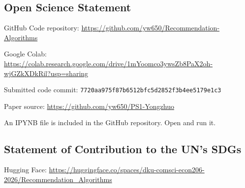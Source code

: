 \subsection*{Open Science Statement}
GitHub Code repository: {\def\UrlBreaks{\do a\do b\do c\do d\do e\do f\do g\do h\do i\do j\do k\do l\do m\do n\do o\do p\do q\do r\do s\do t\do u\do v\do w\do x\do y\do z\do A\do B\do C\do D\do E\do F\do G\do H\do I\do J\do K\do L\do M\do N\do O\do P\do Q\do R\do S\do T\do U\do V\do W\do X\do Y\do Z\do 0\do 1\do 2\do 3\do 4\do 5\do 6\do 7\do 8\do 9\do /\do -\do _\do .\do ?\do =\do &}\url{https://github.com/yw650/Recommendation-Algorithms}}

Google Colab: {\def\UrlBreaks{\do a\do b\do c\do d\do e\do f\do g\do h\do i\do j\do k\do l\do m\do n\do o\do p\do q\do r\do s\do t\do u\do v\do w\do x\do y\do z\do A\do B\do C\do D\do E\do F\do G\do H\do I\do J\do K\do L\do M\do N\do O\do P\do Q\do R\do S\do T\do U\do V\do W\do X\do Y\do Z\do 0\do 1\do 2\do 3\do 4\do 5\do 6\do 7\do 8\do 9\do /\do -\do _\do .\do ?\do =\do &}\url{https://colab.research.google.com/drive/1mYoomco3ywsZb8PaX2oh-wjGZkXDkRil?usp=sharing}}

Submitted code commit: {\def\UrlBreaks{\do a\do b\do c\do d\do e\do f\do g\do h\do i\do j\do k\do l\do m\do n\do o\do p\do q\do r\do s\do t\do u\do v\do w\do x\do y\do z\do A\do B\do C\do D\do E\do F\do G\do H\do I\do J\do K\do L\do M\do N\do O\do P\do Q\do R\do S\do T\do U\do V\do W\do X\do Y\do Z\do 0\do 1\do 2\do 3\do 4\do 5\do 6\do 7\do 8\do 9\do /\do -\do _\do .\do ?\do =\do &}\nolinkurl{7720aa975f87b6512bfc5d2852f3b4ee5179e1c3}}

Paper source: {\def\UrlBreaks{\do a\do b\do c\do d\do e\do f\do g\do h\do i\do j\do k\do l\do m\do n\do o\do p\do q\do r\do s\do t\do u\do v\do w\do x\do y\do z\do A\do B\do C\do D\do E\do F\do G\do H\do I\do J\do K\do L\do M\do N\do O\do P\do Q\do R\do S\do T\do U\do V\do W\do X\do Y\do Z\do 0\do 1\do 2\do 3\do 4\do 5\do 6\do 7\do 8\do 9\do /\do -\do _\do .\do ?\do =\do &}\url{https://github.com/yw650/PS1-Yongzhuo}}

An IPYNB file is included in the GitHub repository. Open and run it.

\subsection*{Statement of Contribution to the UN’s SDGs}
Hugging Face: {\def\UrlBreaks{\do a\do b\do c\do d\do e\do f\do g\do h\do i\do j\do k\do l\do m\do n\do o\do p\do q\do r\do s\do t\do u\do v\do w\do x\do y\do z\do A\do B\do C\do D\do E\do F\do G\do H\do I\do J\do K\do L\do M\do N\do O\do P\do Q\do R\do S\do T\do U\do V\do W\do X\do Y\do Z\do 0\do 1\do 2\do 3\do 4\do 5\do 6\do 7\do 8\do 9\do /\do -\do _\do .\do ?\do =\do &}\url{https://huggingface.co/spaces/dku-comsci-econ206-2026/Recommendation_Algorithms}}

